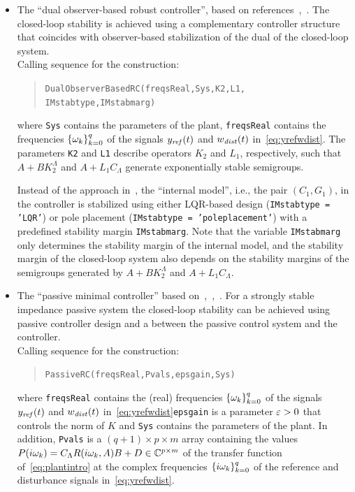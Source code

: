 \documentclass[11pt, a4paper]{amsart}
\newcommand{\CL}{C_\Lambda}
\theoremstyle{definition}
\numberwithin{equation}{section}
\newcommand{\yref}{y_{\mbox{\scriptsize\textit{ref}}}}
\newcommand{\wdist}{w_{\mbox{\scriptsize\textit{dist}}}}
\begin{document}
\begin{itemize}
  \item The ``dual observer-based robust controller'', based on references~,~. The closed-loop stability is achieved using a complementary controller structure that coincides with observer-based stabilization of the dual of the closed-loop system.\\[1ex]
      Calling sequence for the construction:\\[-1ex]
     \begin{quotation}
       \texttt{DualObserverBasedRC(freqsReal,Sys,K2,L1,\\
	 \phantom{a}\hspace{2.7cm} IMstabtype,IMstabmarg)}
     \end{quotation}
     \medskip
     where \texttt{Sys} contains the parameters of the plant, \texttt{freqsReal} contains the frequencies $\{\omega_k\}_{k=0}^q$ of the signals $\yref(t)$ and $\wdist(t)$ in~\eqref{eq:yrefwdist}. The parameters \texttt{K2} and \texttt{L1} describe operators $K_2$ and $L_1$, respectively, such that $A+BK_2^\Lambda$ and $A+L_1\CL$ generate exponentially stable semigroups.

     Instead of the approach in~\cite{Pau16a}, the ``internal model'', i.e., the pair $(C_1,G_1)$, in the controller is stabilized using either LQR-based design (\texttt{IMstabtype = 'LQR'}) or pole placement (\texttt{IMstabtype = 'poleplacement'}) with a predefined stability margin \texttt{IMstabmarg}. Note that the variable \texttt{IMstabmarg} only determines the stability margin of the internal model, and the stability margin of the closed-loop system also depends on the stability margins of the semigroups generated by $A+BK_2^\Lambda$ and $A+L_1\CL$.

	\bigskip

  \item The ``passive minimal controller'' based on~,~,~\cite{PauLeGLHMNC18}. For a strongly stable impedance passive system the closed-loop stability can be achieved using passive controller design and a  between the passive control system and the controller.\\[1ex]
      Calling sequence for the construction:\\[-1ex]
     \begin{quotation}
	 \texttt{PassiveRC(freqsReal,Pvals,epsgain,Sys)}
     \end{quotation}
     \medskip
     where
     \texttt{freqsReal} contains the (real) frequencies $\{\omega_k\}_{k=0}^q$ of the signals $\yref(t)$ and $\wdist(t)$ in~\eqref{eq:yrefwdist}\texttt{epsgain} is a parameter $\varepsilon>0$ that controls the norm of $K$ and \texttt{Sys} contains the parameters of the plant.
     In addition, \texttt{Pvals} is a $(q+1)\times p\times m$ array containing the values $P(i\gw_k)=\CL R(i\gw_k,A)B+D\in \C^{p\times m}$ of the transfer function of~\eqref{eq:plantintro} at the complex frequencies $\{i\omega_k\}_{k=0}^q$ of the reference and disturbance signals in~\eqref{eq:yrefwdist}.


\end{itemize}
\end{document}
